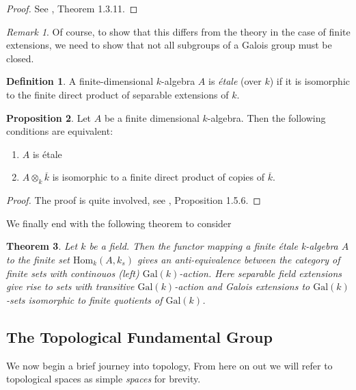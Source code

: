 \documentclass{article}
\newtheorem{theorem}{Theorem}[section]
\theoremstyle{definition}
\newtheorem{proposition}[theorem]{Proposition}
\newtheorem{definition}[theorem]{Definition}
\theoremstyle{remark}
\newtheorem*{remark}{Remark}
\begin{document}
\begin{proof}
	See \cite{Szamuely}, Theorem 1.3.11. 
\end{proof}


\begin{remark}
	Of course, to show that this differs from the theory in the case of finite extensions, we need to show that not all subgroups of a Galois group must be closed.
\end{remark}

\begin{definition}
	A finite-dimensional $k$-algebra $A$ is \textit{\'etale} (over $k$) if it is isomorphic to the finite direct product of separable extensions of $k$.
\end{definition}

\begin{proposition}
	Let $A$ be a finite dimensional $k$-algebra.
	Then the following conditions are equivalent:
	\begin{enumerate}
		\item $A$ is \'etale
		\item $A \otimes_k \overline{k}$ is isomorphic to a finite direct product of copies of $\overline{k}$.
	\end{enumerate}
\end{proposition}
\begin{proof}
	The proof is quite involved, see \cite{Szamuely}, Proposition 1.5.6.
\end{proof}

We finally end with the following theorem to consider 
\begin{theorem}
	Let $k$ be a field. 
	Then the functor mapping a finite \'etale k-algebra $A$ to the finite set $\text{Hom}_k(A, k_s)$ gives an anti-equivalence between the category of finite sets with continouos (left) $\text{Gal}(k)$-action.
	Here separable field extensions give rise to sets with transitive $\text{Gal}(k)$-action and Galois extensions to $\text{Gal}(k)$ -sets isomorphic to finite quotients of $\text{Gal}(k)$.
\end{theorem}


\subsection{The Topological Fundamental Group}

We now begin a brief journey into topology,
From here on out we will refer to topological spaces as simple \textit{spaces} for brevity.
\end{document}
